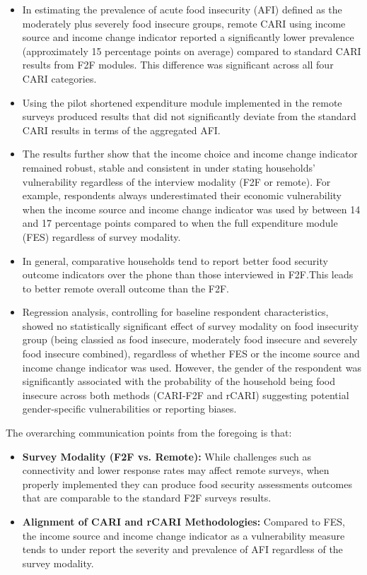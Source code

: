 \documentclass[11pt,harvard]{article}
\begin{document}
	\begin{itemize}
		\item In estimating the prevalence of acute food insecurity (AFI) defined as the moderately plus severely food insecure groups, remote CARI using income source and income change indicator reported a significantly lower prevalence (approximately 15 percentage points on average) compared to standard CARI results from F2F modules. This difference was significant across all four CARI categories.
		\item Using the pilot shortened expenditure module implemented in the remote surveys produced results that did not significantly deviate from the standard CARI results in terms of the aggregated AFI.
		\item The results further show that the income choice and income change indicator remained robust, stable and consistent in under stating households' vulnerability regardless of the interview modality (F2F or remote). For example, respondents always underestimated their economic vulnerability when the income source and income change indicator was used by between 14 and 17 percentage points compared to when the full expenditure module (FES) regardless of survey modality.
		\item In general, comparative households tend to report better food security outcome indicators over the phone than those interviewed in F2F.This leads to better remote overall outcome than the F2F.
		\item Regression analysis, controlling for baseline respondent characteristics, showed no statistically significant effect of survey modality on food insecurity group (being classied as food insecure, moderately food insecure and severely food insecure combined), regardless of whether FES or the income source and income change indicator was used. However, the gender of the respondent was significantly associated with the probability of the household being food insecure across both methods (CARI-F2F and rCARI) suggesting potential gender-specific vulnerabilities or reporting biases.
	\end{itemize}
	
		The overarching communication points from the foregoing is that:
	\begin{itemize}[left=2.5em]
		\item \textbf{Survey Modality (F2F vs. Remote):} While challenges such as connectivity and lower response rates may affect remote surveys, when properly implemented they can produce food security assessments outcomes that are comparable to the standard F2F surveys results.
		\item \textbf{Alignment of CARI and rCARI Methodologies:} Compared to FES, the income source and income change indicator as a vulnerability measure tends to under report the severity and prevalence of AFI regardless of the survey modality.
	\end{itemize}
	
\end{document}
